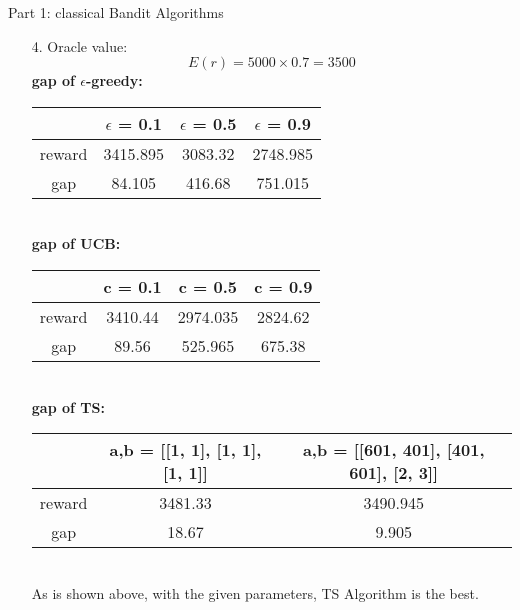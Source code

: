 \documentclass{article}
\begin{document}
\begin{homeworkProblem}{Part 1: classical Bandit Algorithms}
\begin{enumerate}
        \item[4.]
        Oracle value:$$E(r) = 5000\times0.7 = 3500$$
        \textbf{gap of $\epsilon$-greedy:}\\
        \begin{tabular}[t]{|c|c|c|c|}
        \hline
         & $\epsilon$ = 0.1 & $\epsilon$ = 0.5 & $\epsilon$ = 0.9 \\
        \hline
        reward & 3415.895 & 3083.32 & 2748.985 \\
        \hline
        gap & 84.105 & 416.68 & 751.015 \\
        \hline
        \end{tabular}\\

        \textbf{gap of UCB:}\\
        \begin{tabular}[t]{|c|c|c|c|}
        \hline
         & c = 0.1 & c = 0.5 & c = 0.9 \\
        \hline
        reward & 3410.44 & 2974.035 & 2824.62 \\
        \hline
        gap & 89.56 & 525.965 & 675.38 \\
        \hline
        \end{tabular}\\

        \textbf{gap of TS:}\\
        \begin{tabular}[t]{|c|c|c|}
        \hline
         & a,b = [[1, 1], [1, 1], [1, 1]] & a,b = [[601, 401], [401, 601], [2, 3]]\\
        \hline
        reward & 3481.33 & 3490.945 \\
        \hline
        gap & 18.67 & 9.905 \\
        \hline
        \end{tabular}\\

        As is shown above, with the given parameters, TS Algorithm is the best.\\


\end{enumerate}
\end{homeworkProblem}
\end{document}
